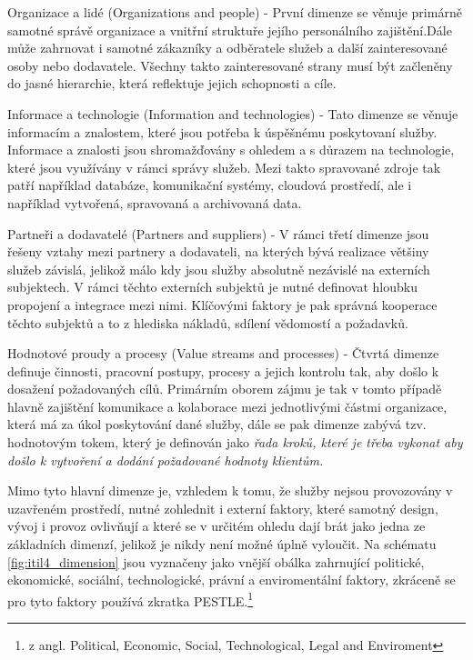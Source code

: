 \documentclass[
  digital,     %
  twoside,     %
  lof,         %
  lot,         %
]{fithesis4}
\begin{document}
\begin{compactitem}
    \item Organizace a lidé (Organizations and people) - První dimenze se věnuje primárně samotné správě organizace a vnitřní struktuře jejího personálního zajištění.Dále může zahrnovat i samotné zákazníky a odběratele služeb a další zainteresované osoby nebo dodavatele. Všechny takto zainteresované strany musí být začleněny do jasné hierarchie, která reflektuje jejich schopnosti a cíle. 
    \item Informace a technologie (Information and technologies) - Tato dimenze se věnuje informacím a znalostem, které jsou potřeba k úspěšnému poskytovaní služby. Informace a znalosti jsou shromažďovány s ohledem a s důrazem na technologie, které jsou využívány v rámci správy služeb. Mezi takto spravované zdroje tak patří například databáze, komunikační systémy, cloudová prostředí, ale i například vytvořená, spravovaná a archivovaná data.
    \item Partneři a dodavatelé (Partners and suppliers) - V rámci třetí dimenze jsou řešeny vztahy mezi partnery a dodavateli, na kterých bývá realizace většiny služeb závislá, jelikož málo kdy jsou služby absolutně nezávislé na externích subjektech. V rámci těchto externích subjektů je nutné definovat hloubku propojení a integrace mezi nimi. Klíčovými faktory je pak správná kooperace těchto subjektů a to z hlediska nákladů, sdílení vědomostí a požadavků.
    \item Hodnotové proudy a procesy (Value streams and processes) - Čtvrtá dimenze definuje činnosti, pracovní postupy, procesy a jejich kontrolu tak, aby došlo k dosažení požadovaných cílů. Primárním oborem zájmu je tak v tomto případě hlavně zajištění komunikace a kolaborace mezi jednotlivými částmi organizace, která má za úkol poskytování dané služby, dále se pak dimenze zabývá tzv. hodnotovým tokem, který je definován jako \emph{řada kroků, které je třeba vykonat aby došlo k vytvoření a dodání požadované hodnoty klientům.}
\end{compactitem}
    
Mimo tyto hlavní dimenze je, vzhledem k tomu, že služby nejsou provozovány v uzavřeném prostředí, nutné zohlednit i externí faktory, které samotný design, vývoj i provoz ovlivňují a které se v určitém ohledu dají brát jako jedna ze základních dimenzí, jelikož je nikdy není možné úplně vyloučit. Na schématu \ref{fig:itil4_dimension} jsou vyznačeny jako vnější obálka zahrnující politické, ekonomické, sociální, technologické, právní a enviromentální faktory, zkráceně se pro tyto faktory používá zkratka PESTLE.\footnote{z angl. Political, Economic, Social, Technological, Legal and Enviroment}
\end{document}
